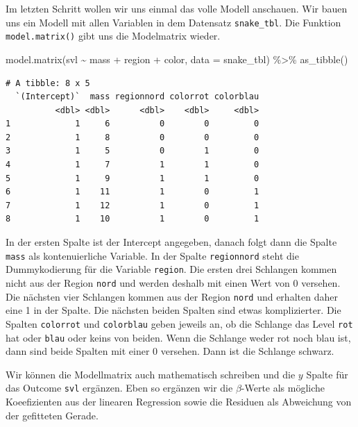 \documentclass[
  letterpaper,
]{scrbook}
\newenvironment{Shaded}{\begin{snugshade}}{\end{snugshade}}
\newcommand{\AttributeTok}[1]{\textcolor[rgb]{0.40,0.45,0.13}{#1}}
\newcommand{\FunctionTok}[1]{\textcolor[rgb]{0.28,0.35,0.67}{#1}}
\newcommand{\NormalTok}[1]{\textcolor[rgb]{0.00,0.23,0.31}{#1}}
\newcommand{\SpecialCharTok}[1]{\textcolor[rgb]{0.37,0.37,0.37}{#1}}
\begin{document}
Im letzten Schritt wollen wir uns einmal das volle Modell anschauen. Wir
bauen uns ein Modell mit allen Variablen in dem Datensatz
\texttt{snake\_tbl}. Die Funktion \texttt{model.matrix()} gibt uns die
Modelmatrix wieder.

\begin{Shaded}
\begin{Highlighting}[]
\FunctionTok{model.matrix}\NormalTok{(svl }\SpecialCharTok{\textasciitilde{}}\NormalTok{ mass }\SpecialCharTok{+}\NormalTok{ region }\SpecialCharTok{+}\NormalTok{ color, }\AttributeTok{data =}\NormalTok{ snake\_tbl) }\SpecialCharTok{\%\textgreater{}\%} \FunctionTok{as\_tibble}\NormalTok{() }
\end{Highlighting}
\end{Shaded}

\begin{verbatim}
# A tibble: 8 x 5
  `(Intercept)`  mass regionnord colorrot colorblau
          <dbl> <dbl>      <dbl>    <dbl>     <dbl>
1             1     6          0        0         0
2             1     8          0        0         0
3             1     5          0        1         0
4             1     7          1        1         0
5             1     9          1        1         0
6             1    11          1        0         1
7             1    12          1        0         1
8             1    10          1        0         1
\end{verbatim}

In der ersten Spalte ist der Intercept angegeben, danach folgt dann die
Spalte \texttt{mass} als kontenuierliche Variable. In der Spalte
\texttt{regionnord} steht die Dummykodierung für die Variable
\texttt{region}. Die ersten drei Schlangen kommen nicht aus der Region
\texttt{nord} und werden deshalb mit einen Wert von 0 versehen. Die
nächsten vier Schlangen kommen aus der Region \texttt{nord} und erhalten
daher eine 1 in der Spalte. Die nächsten beiden Spalten sind etwas
komplizierter. Die Spalten \texttt{colorrot} und \texttt{colorblau}
geben jeweils an, ob die Schlange das Level \texttt{rot} hat oder
\texttt{blau} oder keins von beiden. Wenn die Schlange weder rot noch
blau ist, dann sind beide Spalten mit einer 0 versehen. Dann ist die
Schlange schwarz.

Wir können die Modellmatrix auch mathematisch schreiben und die \(y\)
Spalte für das Outcome \texttt{svl} ergänzen. Eben so ergänzen wir die
\(\beta\)-Werte als mögliche Koeefizienten aus der linearen Regression
sowie die Residuen als Abweichung von der gefitteten Gerade.
\end{document}
